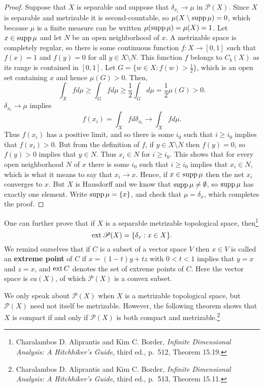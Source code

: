 \documentclass{article}
\newcommand{\supp}{\ensuremath\mathrm{supp}\,}
\newcommand{\ext}{\ensuremath\mathrm{ext}\,}
\theoremstyle{definition}
\begin{document}
\begin{proof}
Suppose that $X$ is separable and suppose that $\delta_{x_i} \to \mu$ in $\mathscr{P}(X)$. 
Since $X$ is separable and metrizable  it is second-countable, so $\mu(X \setminus \supp \mu)=0$, which because $\mu$ is a finite measure
can be written $\mu(\supp \mu)=\mu(X)=1$. Let $x \in \supp \mu$ and let $N$ be an open neighborhood of $x$. 
 A metrizable space is completely regular,  so there is some continuous function $f:X \to [0,1]$ such that
$f(x)=1$ and $f(y)=0$ for all $y \in X \setminus N$. This function $f$ belongs to $C_b(X)$ as its range is contained in $[0,1]$.
Let $G=\{w \in X: f(w)>\frac{1}{2}\}$, which is an open set containing $x$ and hence
$\mu(G)>0$. Then,
\[
\int_X f d\mu \geq \int_G f d\mu \geq \frac{1}{2} \int_G d\mu= \frac{1}{2}\mu(G)>0.
\]
 $\delta_{x_i} \to \mu$ implies
\[
f(x_i) = \int_X f d\delta_{x_i} \to \int_X f d\mu.
\]
Thus $f(x_i)$ has a positive limit, and so there is some $i_0$ such that $i \geq i_0$ implies that
$f(x_i)>0$. 
But from the definition of $f$, if $y \in X \setminus N$ then $f(y)=0$, so $f(y)>0$ implies that $y  \in N$. Thus $x_i \in N$ for $i \geq i_0$.
This shows that for every open neighborhood $N$ of $x$ there is some $i_0$ such that $i \geq i_0$
implies that $x_i \in N$, which is what it means to say that $x_i \to x$. Hence, if $x \in \supp \mu$ then the net $x_i$ converges  to $x$. But
$X$ is Hausdorff and we know that $\supp \mu \neq \emptyset$, so $\supp \mu$ has exactly one element. Write $\supp \mu = \{x\}$, and 
check that $\mu=\delta_x$, which completes the proof.
\end{proof}

One can further prove that if $X$ is a separable metrizable topological space, then\footnote{Charalambos D. 
Aliprantis and Kim C. Border, {\em Infinite Dimensional Analysis: A Hitchhiker's Guide}, third ed., p.~512, Theorem 15.19.}
\[
\ext \mathscr{P}(X) = \{\delta_x: x \in X\}.
\]
We remind ourselves that if $C$ is a subset of a vector space $V$ then $x \in V$ is called an \textbf{extreme point} of $C$
if $x=(1-t)y+tz$ with $0<t<1$ implies that $y=x$ and $z=x$, and 
$\ext C$ denotes the set of extreme points of $C$. Here the vector space is $ca(X)$, of
which $\mathscr{P}(X)$ is a convex subset.



We only speak about $\mathscr{P}(X)$ when $X$ is a  metrizable topological space, but
$\mathscr{P}(X)$  need not  itself be metrizable. However, the following theorem shows that
$X$ is compact if and only if $\mathscr{P}(X)$ is both compact and metrizable.\footnote{Charalambos D. 
Aliprantis and Kim C. Border, {\em Infinite Dimensional Analysis: A Hitchhiker's Guide}, third ed., p.~513, Theorem 15.11.}
\end{document}

